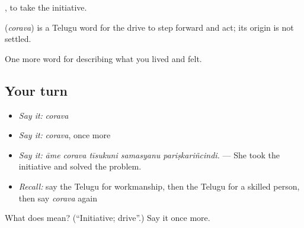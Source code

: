  , to take the initiative.

\begin{cousinweb}
\textbf{} (\emph{corava}) is a Telugu word for the drive to step forward and act; its origin is not settled.
\end{cousinweb}

\begin{grammarlens}[title={What you've built}]
One more word for describing what you lived and felt.
\end{grammarlens}

\subsection*{Your turn}
\begin{itemize}
\raggedright
  \item \emph{Say it:} \emph{corava}
  \item \emph{Say it:} \emph{corava}, once more
  \item \emph{Say it:} \emph{āme corava tīsukuni samasyanu pariṣkariñcindi.} — She took the initiative and solved the problem.
  \item \emph{Recall:} say the Telugu for workmanship, then the Telugu for a skilled person, then say \emph{corava} again
\end{itemize}

\begin{tcolorbox}[breakable,colback=teal!4,colframe=teal!35!black,title={Before you move on}]
What does  mean? (\textquotedblleft{}Initiative; drive\textquotedblright{}.) Say it once more.
\end{tcolorbox}

